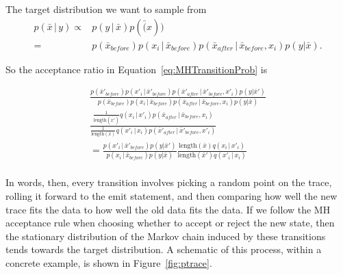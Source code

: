 \documentclass{article}
\newcommand{\given}{\, |\,}
\begin{document}
The target distribution we want to sample from 
\begin{align}
p(\bar{x} \given y) \propto & p(y \given \bar{x}) p(\bar(x))\\
                    =& p(\bar{x}_{before}) p(x_i \given \bar{x}_{before})
                    p(\bar{x}_{after} \given \bar{x}_{before}, x_i)
                    p(y|\bar{x}).
\end{align}

So the acceptance ratio in Equation~\ref{eq:MHTransitionProb} is

\begin{align}
\frac{p(\bar{x}'_{before}) p(x'_i \given \bar{x}'_{before})
                    p(\bar{x}'_{after} \given \bar{x}'_{before}, x'_i)
                   p(y|\bar{x}')}
                   {p(\bar{x}_{before}) p(x_i \given \bar{x}_{before})
                    p(\bar{x}_{after} \given \bar{x}_{before}, x_i)
                    p(y|\bar{x})}\\
\frac{\frac{1}{\text{length}(\bar{x'})} 
                           q(x_i \given x'_i) p(\bar{x}_{after} \given \bar{x}_{before}, x_i)
                        }{\frac{1}{\text{length}(\bar{x})} 
                           q(x'_i \given x_i) p(\bar{x}'_{after} \given
                           \bar{x}'_{before}, x'_i)}\\
= \frac{p(x'_i \given \bar{x}'_{before})
        p(y|\bar{x}')}
{p(x_i \given \bar{x}_{before})
 p(y|\bar{x})}
\frac{\text{length}(\bar{x})
    q(x_i \given x'_i) }
    {\text{length}(\bar{x}') 
    q(x'_i \given x_i)}\\
\end{align}

In words, then, every transition involves picking a random point on the trace,
rolling it forward to the emit statement, and then comparing how well the new
trace fits the data to how well the old data fits the data. If we follow the MH
acceptance rule when choosing whether to accept or reject the new state, then
the stationary distribution of the Markov chain induced by these transitions
tends towards the target distribution.  A schematic of this process, within a
concrete example, is shown in Figure~\ref{fig:ptrace}.  
\end{document}
